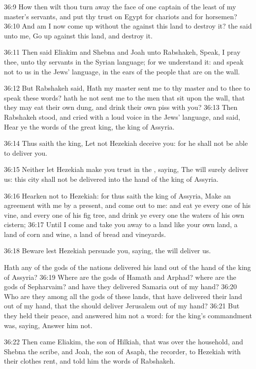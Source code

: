 36:9 How then wilt thou turn away the face of one captain of the least
of my master's servants, and put thy trust on Egypt for chariots and
for horsemen?  36:10 And am I now come up without the \LORD against
this land to destroy it? the \LORD said unto me, Go up against this
land, and destroy it.

36:11 Then said Eliakim and Shebna and Joah unto Rabshakeh, Speak, I
pray thee, unto thy servants in the Syrian language; for we understand
it: and speak not to us in the Jews' language, in the ears of the
people that are on the wall.

36:12 But Rabshakeh said, Hath my master sent me to thy master and to
thee to speak these words? hath he not sent me to the men that sit
upon the wall, that they may eat their own dung, and drink their own
piss with you?  36:13 Then Rabshakeh stood, and cried with a loud
voice in the Jews' language, and said, Hear ye the words of the great
king, the king of Assyria.

36:14 Thus saith the king, Let not Hezekiah deceive you: for he shall
not be able to deliver you.

36:15 Neither let Hezekiah make you trust in the \LORD, saying, The
\LORD will surely deliver us: this city shall not be delivered into the
hand of the king of Assyria.

36:16 Hearken not to Hezekiah: for thus saith the king of Assyria,
Make an agreement with me by a present, and come out to me: and eat ye
every one of his vine, and every one of his fig tree, and drink ye
every one the waters of his own cistern; 36:17 Until I come and take
you away to a land like your own land, a land of corn and wine, a land
of bread and vineyards.

36:18 Beware lest Hezekiah persuade you, saying, the \LORD will deliver
us.

Hath any of the gods of the nations delivered his land out of the hand
of the king of Assyria?  36:19 Where are the gods of Hamath and
Arphad? where are the gods of Sepharvaim? and have they delivered
Samaria out of my hand?  36:20 Who are they among all the gods of
these lands, that have delivered their land out of my hand, that the
\LORD should deliver Jerusalem out of my hand?  36:21 But they held
their peace, and answered him not a word: for the king's commandment
was, saying, Answer him not.

36:22 Then came Eliakim, the son of Hilkiah, that was over the
household, and Shebna the scribe, and Joah, the son of Asaph, the
recorder, to Hezekiah with their clothes rent, and told him the words
of Rabshakeh.

